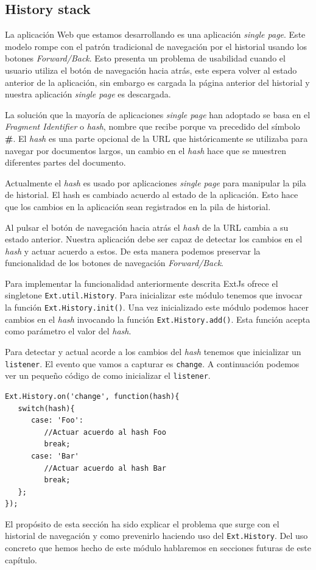 	\subsection{History stack}
		La aplicación Web que estamos desarrollando es una aplicación \emph{single page}. Este modelo rompe con el patrón tradicional de
		navegación por el historial usando los botones \emph{Forward/Back}. Esto presenta un problema de usabilidad cuando el usuario utiliza
		el botón de navegación hacia atrás, este espera volver al estado anterior de la aplicación, sin embargo es cargada la página anterior
		del historial y nuestra aplicación \emph{single page} es descargada.
		\par
		La solución que la mayoría de aplicaciones \emph{single page} han adoptado se basa en el \emph{Fragment Identifier}  o \emph{hash},
		nombre que recibe porque va precedido del símbolo \textbf{\#}. El \emph{hash} es una parte opcional de la URL que históricamente se
		utilizaba para navegar por documentos largos, un cambio en el \emph{hash} hace que se muestren diferentes partes del documento.
		\par
		Actualmente el \emph{hash} es usado por aplicaciones \emph{single page} para manipular la pila de historial. El hash es cambiado
		acuerdo al estado de la aplicación. Esto hace que los cambios en la aplicación sean registrados en la pila de historial.
		\par
		Al pulsar el botón de navegación hacia atrás el \emph{hash} de la URL cambia a su estado anterior. Nuestra aplicación debe ser capaz
		de detectar los cambios en el \emph{hash} y actuar acuerdo a estos. De esta manera podemos preservar la funcionalidad de los botones
		de navegación \emph{Forward/Back}. 
		\par
		Para implementar la funcionalidad anteriormente descrita ExtJs ofrece el singletone \texttt{Ext.util.History}. Para inicializar este
		módulo tenemos que invocar la función \texttt{Ext.History.init()}. Una vez inicializado este módulo podemos hacer cambios en el
		\emph{hash} invocando la función \texttt{Ext.History.add()}. Esta función acepta como parámetro el valor del \emph{hash}. 
		\par
		Para detectar y actual acorde a los cambios del \emph{hash} tenemos que inicializar un \texttt{listener}. El evento que vamos a
		capturar es \texttt{change}. A continuación podemos ver un pequeño código de como inicializar el \texttt{listener}.
		\begin{lstlisting}[style=myJs]
Ext.History.on('change', function(hash){
   switch(hash){
      case: 'Foo':
         //Actuar acuerdo al hash Foo
         break;
      case: 'Bar'
         //Actuar acuerdo al hash Bar
         break;
   };
});
		\end{lstlisting}
		\par
		El propósito de esta sección ha sido explicar el problema que surge con el historial de navegación y como prevenirlo haciendo uso del
		\texttt{Ext.History}. Del uso concreto que hemos hecho de este módulo hablaremos en secciones futuras de este capítulo.

